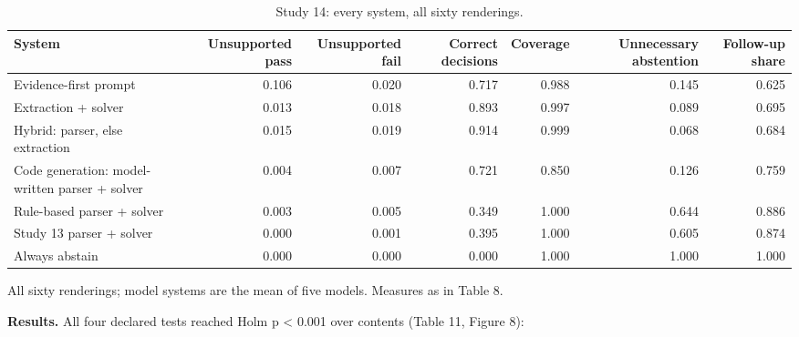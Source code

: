 \documentclass[10pt,twocolumn]{article}
\begin{document}
\begin{table}[t]
\centering\footnotesize\setlength{\tabcolsep}{4pt}
\caption{Study 14: every system, all sixty renderings.}
\label{tab:10}
\begin{adjustbox}{max width=\textwidth}
\begin{tabular}{lrrrrrr}
\toprule
\textbf{System} & \textbf{Unsupported pass} & \textbf{Unsupported fail} & \textbf{Correct decisions} & \textbf{Coverage} & \textbf{Unnecessary abstention} & \textbf{Follow-up share} \\
\midrule
Evidence-first prompt & 0.106 & 0.020 & 0.717 & 0.988 & 0.145 & 0.625 \\
Extraction + solver & 0.013 & 0.018 & 0.893 & 0.997 & 0.089 & 0.695 \\
Hybrid: parser, else extraction & 0.015 & 0.019 & 0.914 & 0.999 & 0.068 & 0.684 \\
Code generation: model-written parser + solver & 0.004 & 0.007 & 0.721 & 0.850 & 0.126 & 0.759 \\
Rule-based parser + solver & 0.003 & 0.005 & 0.349 & 1.000 & 0.644 & 0.886 \\
Study 13 parser + solver & 0.000 & 0.001 & 0.395 & 1.000 & 0.605 & 0.874 \\
Always abstain & 0.000 & 0.000 & 0.000 & 1.000 & 1.000 & 1.000 \\
\bottomrule
\end{tabular}
\end{adjustbox}
\par\vspace{3pt}\begin{minipage}{\textwidth}\scriptsize All sixty renderings; model systems are the mean of five models. Measures as in Table 8.\end{minipage}
\end{table}

\textbf{Results.} All four declared tests reached Holm p < 0.001 over contents (Table 11, Figure 8):
\end{document}
